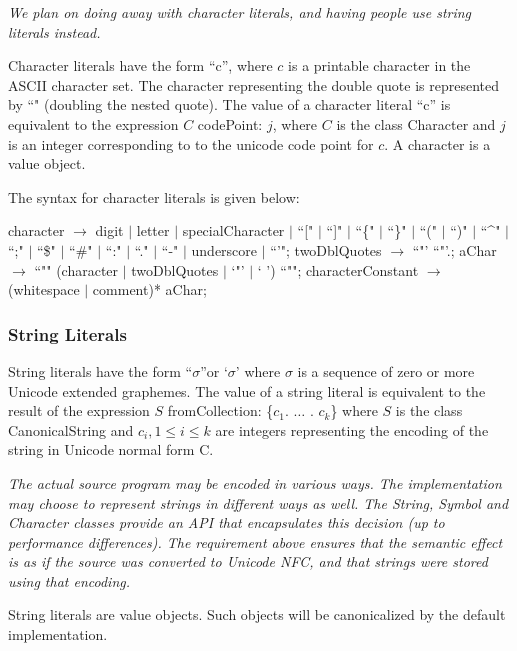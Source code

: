 \documentclass{article}
\newcommand{\code}[1]{{\sf #1}}
\begin{document}
{\it We plan on doing away with character literals, and having people use string literals instead. 
}

Character literals have the form \code{``c''}, where $c$ is a printable character in the ASCII character set. 
The character representing the double quote is represented by \code{``"} (doubling the nested quote).
The value of a character literal \code{``c''} is equivalent to the expression  \code{$C$ codePoint: $j$},  where $C$ is the class \code{Character}  and $j$ is an integer corresponding to to the unicode code point for  $c$. A character is a value object. 

The syntax for character literals is given below:
 
\begin{newspeak}
character $\rightarrow$ digit $|$ letter $|$ specialCharacter $|$  ``[" $|$  ``]"  $|$
                 ``\{" $|$  ``\}" $|$  ``("  $|$  ``)" $|$ 
                 ``\^{}" $|$  ``;" $|$  ``\$" $|$  ``\#" $|$
                 ``:" $|$  ``." $|$  ``-" $|$ underscore $|$  ``\textquoteright"; 
twoDblQuotes $\rightarrow$   ``"'   ``"'.;      
aChar $\rightarrow$  ``""  (character $|$ twoDblQuotes $|$  `"' $|$ `  ')  ``"";
characterConstant $\rightarrow$ (whitespace $|$ comment)*  aChar;
\end{newspeak}
 
\subsubsection{ String Literals}
\label{string}

String literals have the form \code{``$\sigma$''}or \code{`$\sigma$'} where $\sigma$ is a sequence of zero or more Unicode extended graphemes. The value of a string literal is equivalent to the result of the expression  \code{$S$ fromCollection: \{$c_1$.  $\ldots$ . $c_k$\}} where $S$ is the class \code{CanonicalString} and $c_i, 1 \le i \le k$ are integers representing the encoding of the string in Unicode normal form C.   

{\it 
The actual source program may be encoded in various ways. The implementation may choose to represent strings in different ways as well. The \code{String}, \code{Symbol} and \code{Character} classes provide an API that encapsulates this decision (up to performance differences). The requirement above ensures that the semantic effect is as if the source was converted to Unicode NFC, and that strings were stored using that encoding.
}

String literals are value objects. Such objects will be canonicalized by the default implementation.
\end{document}
